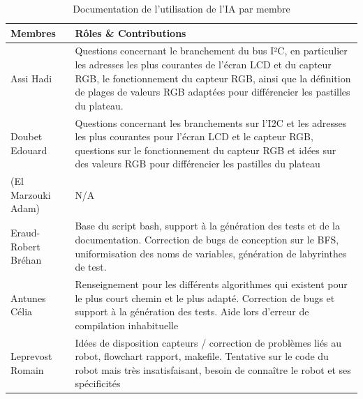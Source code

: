 \begin{table}[H]
    \centering
    \renewcommand{\arraystretch}{1.4} %
    \setlength{\tabcolsep}{12pt}      %
    
    \begin{tabular}{@{} l p{12cm} @{}} 
    \toprule
    \textbf{Membres} & \textbf{Rôles \& Contributions} \\ 
    \midrule
    
    Assi Hadi & Questions concernant le branchement du bus I²C, en particulier les adresses les plus courantes de l’écran LCD et du capteur RGB, le fonctionnement du capteur RGB, ainsi que la définition de plages de valeurs RGB adaptées pour différencier les pastilles du plateau.  \\ 
    Doubet Edouard & Questions concernant les branchements sur l'I2C et les adresses les plus courantes pour l'écran LCD et le capteur RGB, questions sur le fonctionnement du capteur RGB et idées sur des valeurs RGB pour différencier les pastilles du plateau  \\ 
    (El Marzouki Adam) & N/A \\ 
    Eraud-Robert Bréhan & Base du script bash, support à la génération des tests et de la documentation. Correction de bugs de conception sur le BFS, uniformisation des noms de variables, génération de labyrinthes de test.  \\ 
    Antunes Célia & Renseignement pour les différents algorithmes qui existent pour le plus court chemin et le plus adapté. Correction de bugs et support à la génération des tests. Aide lors d'erreur de compilation inhabituelle \\ 
    Leprevost Romain & Idées de disposition capteurs / correction de problèmes liés au robot, flowchart rapport, makefile. Tentative sur le code du robot mais très insatisfaisant, besoin de connaître le robot et ses spécificités \\ 
    
    \bottomrule
    \end{tabular}
    \caption{Documentation de l'utilisation de l'IA par membre}
    \label{tab:ia}
\end{table}